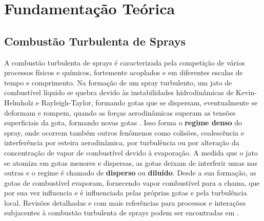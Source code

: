 

\section{Fundamentação Teórica}



\subsection{Combustão Turbulenta de Sprays} \label{sec:teoria}

A combustão turbulenta de sprays é caracterizada pela competição de vários processos físicos e químicos, fortemente acoplados e em diferentes escalas de tempo e comprimento. 
Na formação de um spray turbulento, um jato de combustível líquido se quebra devido às instabilidades hidrodinâmicas de Kevin-Helmholz e Rayleigh-Taylor, formando gotas que se dispersam, eventualmente se deformam e rompem, quando as forças aerodinâmicas superam as tensões superficiais da gota, formando novas gotas \cite{JennyB2012}.
Isso forma o \textbf{regime denso} do spray, onde ocorrem também outros fenômenos como colisões, coalescência e interferência por esteira aerodinâmica, por turbulência ou por alteração da concentração de vapor de combustível devido à evaporação.
A medida que o jato se atomiza em gotas menores e dispersas, as gotas deixam de interferir umas nas outras e o regime é chamado de \textbf{disperso} ou \textbf{diluído}. 
Desde a sua formação, as gotas de combustível evaporam, fornecendo vapor combustível para a chama, que por sua vez influencia e é influenciada pelas próprias gotas e pela turbulência local.
Revisões detalhadas e com mais referências para processos e interações subjacentes à combustão turbulenta de sprays podem ser encontradas em \cite{JennyB2012, MasriA2016, SanchezA2015, ZhouL2021,JiangX2010}.

